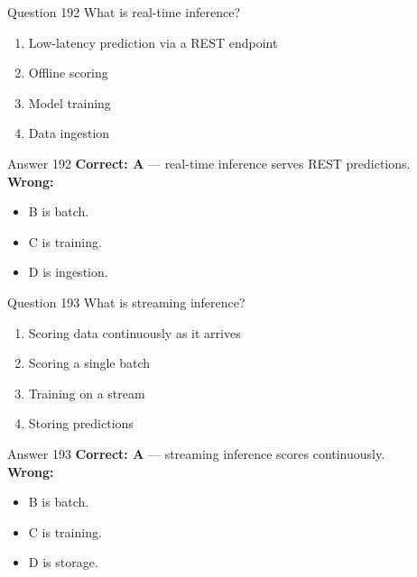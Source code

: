 \documentclass[aspectratio=169,11pt]{beamer}
\begin{document}
	\begin{frame}{Question 192}
		What is real-time inference?
		\begin{enumerate}[label=\Alph*.]
			\item Low-latency prediction via a REST endpoint
			\item Offline scoring
			\item Model training
			\item Data ingestion
		\end{enumerate}
	\end{frame}
	\begin{frame}{Answer 192}
		\textbf{Correct: A} --- real-time inference serves REST predictions.\\
		\vspace{0.5em}
		\textbf{Wrong:}
		\begin{itemize}
			\item B is batch.
			\item C is training.
			\item D is ingestion.
		\end{itemize}
	\end{frame}
	
	\begin{frame}{Question 193}
		What is streaming inference?
		\begin{enumerate}[label=\Alph*.]
			\item Scoring data continuously as it arrives
			\item Scoring a single batch
			\item Training on a stream
			\item Storing predictions
		\end{enumerate}
	\end{frame}
	\begin{frame}{Answer 193}
		\textbf{Correct: A} --- streaming inference scores continuously.\\
		\vspace{0.5em}
		\textbf{Wrong:}
		\begin{itemize}
			\item B is batch.
			\item C is training.
			\item D is storage.
		\end{itemize}
	\end{frame}
	
\end{document}
